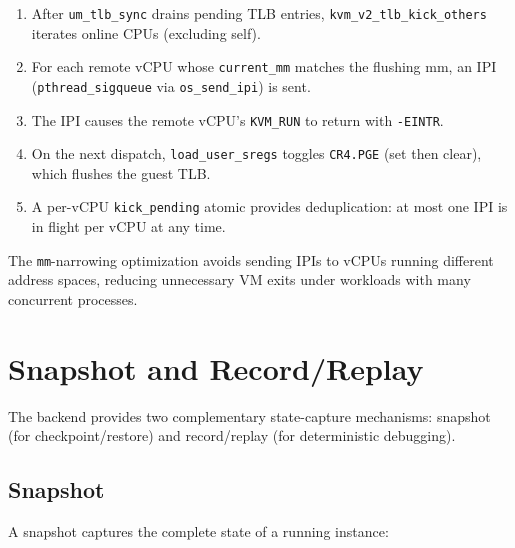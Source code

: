 \begin{enumerate}[leftmargin=2em]
  \item After \texttt{um\_tlb\_sync} drains pending TLB entries,
    \texttt{kvm\_v2\_tlb\_kick\_others} iterates online CPUs (excluding self).
  \item For each remote vCPU whose \texttt{current\_mm} matches the flushing
    mm, an IPI (\texttt{pthread\_sigqueue} via \texttt{os\_send\_ipi}) is sent.
  \item The IPI causes the remote vCPU's \texttt{KVM\_RUN} to return
    with \texttt{-EINTR}.
  \item On the next dispatch, \texttt{load\_user\_sregs} toggles
    \texttt{CR4.PGE} (set then clear), which flushes the guest TLB.
  \item A per-vCPU \texttt{kick\_pending} atomic provides deduplication:
    at most one IPI is in flight per vCPU at any time.
\end{enumerate}

The \texttt{mm}-narrowing optimization avoids sending IPIs to vCPUs running
different address spaces, reducing unnecessary VM exits under workloads with
many concurrent processes.


\section{Snapshot and Record/Replay}
\label{sec:kvm-snapshot}

The \KVMvTwo{} backend provides two complementary state-capture mechanisms:
snapshot (for checkpoint/restore) and record/replay (for deterministic
debugging).

\subsection{Snapshot}

A snapshot captures the complete state of a running \UML{} instance:


